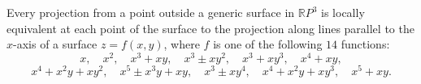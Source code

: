 Every projection from a point outside a generic surface in $\mathbb{R}P^3$ is locally equivalent at each point of the surface to the projection along lines parallel to the $x$-axis of a surface $z = f(x, y)$, where $f$ is one of the following $14$ functions:
$$x,\quad x^2,\quad x^3 + xy,\quad x^3 \pm xy^2,\quad x^3 + xy^3,\quad x^4 + xy,$$
$$x^4 + x^2y + xy^2,\quad x^5 \pm x^3y + xy,\quad x^3 \pm xy^4,\quad x^4 + x^2y + xy^3,\quad x^5 + xy.$$
